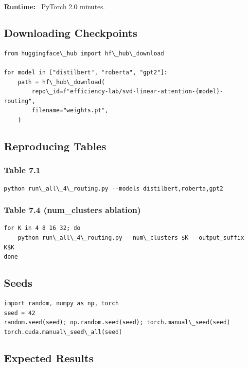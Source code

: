 \textbf{Runtime:} ~PyTorch 2.0 minutes.

\subsection{Downloading Checkpoints}

\begin{lstlisting}
from huggingface\_hub import hf\_hub\_download

for model in ["distilbert", "roberta", "gpt2"]:
    path = hf\_hub\_download(
        repo\_id=f"efficiency-lab/svd-linear-attention-{model}-routing",
        filename="weights.pt",
    )
\end{lstlisting}

\subsection{Reproducing Tables}

\subsubsection{Table 7.1}

\begin{lstlisting}
python run\_all\_4\_routing.py --models distilbert,roberta,gpt2
\end{lstlisting}

\subsubsection{Table 7.4 (num\_clusters ablation)}

\begin{lstlisting}
for K in 4 8 16 32; do
    python run\_all\_4\_routing.py --num\_clusters $K --output_suffix K$K
done
\end{lstlisting}

\subsection{Seeds}

\begin{lstlisting}
import random, numpy as np, torch
seed = 42
random.seed(seed); np.random.seed(seed); torch.manual\_seed(seed)
torch.cuda.manual\_seed\_all(seed)
\end{lstlisting}

\subsection{Expected Results}

